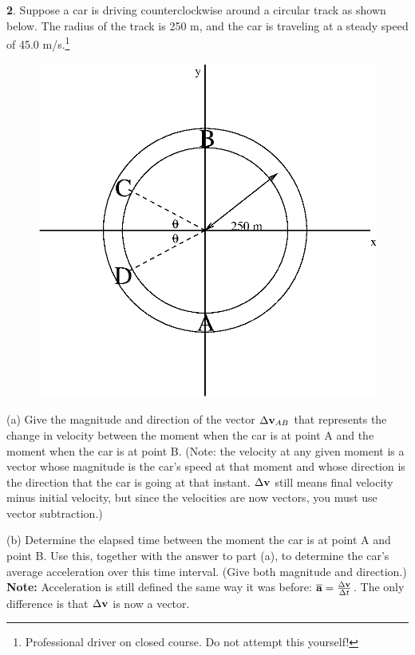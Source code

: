\vfil\eject


{\bf 2}.  Suppose a car is driving counterclockwise around a circular track as shown
below.  The radius of the track is 250 m, and the car is traveling
at a steady speed of 45.0 m/s.\footnote{Professional driver on closed
course.  Do not attempt this yourself!}

\begin{figure}[h]
\centerline{\includegraphics{vectors/veclabfig.eps}}
\end{figure}

(a) Give the magnitude and direction of the vector $\Delta{\bf v}_{AB}$
that represents the change in velocity between the moment when the
car is at point A and the moment when the car is at point B.  (Note:
the velocity at any given moment is a vector whose magnitude is the
car's speed at that moment and whose direction is the direction that
the car is going at that instant.  $\Delta{\bf v}$ still means
final velocity minus initial velocity, but since the velocities are
now vectors, you must use vector subtraction.)

\vfil

(b) Determine the elapsed time between the moment the car is at point A
and point B.  Use this, together with the answer to part (a), to determine
the car's average acceleration over this time interval.  (Give both magnitude
and direction.)  {\bf Note:} Acceleration is still defined the same
way it was before: $\overline{\bf a}={\Delta {\bf v}\over\Delta t}$.
The only difference is that $\Delta{\bf v}$ is now a vector.


